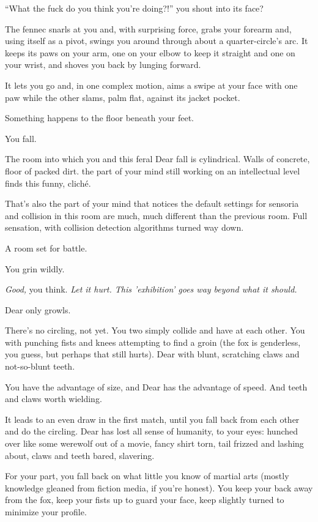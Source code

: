 ``What the fuck do you think you're doing?!'' you shout into its face?

The fennec snarls at you and, with surprising force, grabs your forearm and, using itself as a pivot, swings you around through about a quarter-circle's arc. It keeps its paws on your arm, one on your elbow to keep it straight and one on your wrist, and shoves you back by lunging forward.

It lets you go and, in one complex motion, aims a swipe at your face with one paw while the other slams, palm flat, against its jacket pocket.

Something happens to the floor beneath your feet.

You fall.


The room into which you and this feral Dear fall is cylindrical. Walls of concrete, floor of packed dirt. the part of your mind still working on an intellectual level finds this funny, cliché.

That's also the part of your mind that notices the default settings for sensoria and collision in this room are much, much different than the previous room. Full sensation, with collision detection algorithms turned way down.

A room set for battle.

You grin wildly.

\emph{Good,} you think. \emph{Let it hurt. This 'exhibition' goes way beyond what it should.}

Dear only growls.

There's no circling, not yet. You two simply collide and have at each other. You with punching fists and knees attempting to find a groin (the fox is genderless, you guess, but perhaps that still hurts). Dear with blunt, scratching claws and not-so-blunt teeth.

You have the advantage of size, and Dear has the advantage of speed. And teeth and claws worth wielding.

It leads to an even draw in the first match, until you fall back from each other and do the circling. Dear has lost all sense of humanity, to your eyes: hunched over like some werewolf out of a movie, fancy shirt torn, tail frizzed and lashing about, claws and teeth bared, slavering.

For your part, you fall back on what little you know of martial arts (mostly knowledge gleaned from fiction media, if you're honest). You keep your back away from the fox, keep your fists up to guard your face, keep slightly turned to minimize your profile.

